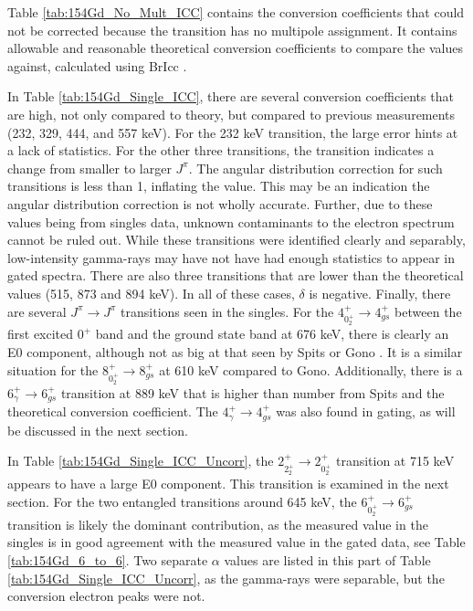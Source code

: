 Table \ref{tab:154Gd_No_Mult_ICC} contains the conversion coefficients that could not be corrected because the transition has no multipole assignment. It contains allowable and reasonable theoretical conversion coefficients to compare the values against, calculated using BrIcc \cite{kibedi08:_BRICC}.

\afterpage{\clearpage}

\afterpage{\clearpage}

\afterpage{\clearpage}   

In Table \ref{tab:154Gd_Single_ICC}, there are several conversion coefficients that are high, not only compared to theory, but compared to previous measurements (232, 329, 444, and 557 keV). For the 232 keV transition, the large error hints at a lack of statistics.  For the other three transitions, the transition indicates a change from smaller to larger $J^{\pi}$. The angular distribution correction for such transitions is less than 1, inflating the value. This may be an indication the angular distribution correction is not wholly accurate. Further, due to these values being from singles data, unknown contaminants to the electron spectrum cannot be ruled out. While these transitions were identified clearly and separably, low-intensity gamma-rays may have not have had enough statistics to appear in gated spectra. There are also three transitions that are lower than the theoretical values (515, 873 and 894 keV). In all of these cases, $\delta$ is negative. Finally, there are several $J^{\pi}\rightarrow J^{\pi}$ transitions seen in the singles. For the $4^+_{0^+_2}\rightarrow 4^+_{gs}$ between the first excited $0^+$ band and the ground state band at 676 keV, there is clearly an E0 component, although not as big at that seen by Spits or Gono \cite{spits96:_154gd, gono74:_154gd_e0}. It is a similar situation for the $8^+_{0^+_2}\rightarrow 8^+_{gs}$ at 610 keV compared to Gono. Additionally, there is a $6_{\gamma}^+\rightarrow 6^+_{gs}$ transition at 889 keV that is higher than number from Spits and the theoretical conversion coefficient. The $4^+_{\gamma}\rightarrow 4^+_{gs}$ was also found in gating, as will be discussed in the next section.

In Table \ref{tab:154Gd_Single_ICC_Uncorr}, the $2^+_{2^+_2}\rightarrow 2^+_{0^+_2}$ transition at 715 keV appears to have a large E0 component. This transition is examined in the next section. For the two entangled transitions around 645 keV, the $6^+_{0^+_2}\rightarrow 6^+_{gs}$ transition is likely the dominant contribution, as the measured value in the singles is in good agreement with the measured value in the gated data, see Table \ref{tab:154Gd_6_to_6}. Two separate $\alpha$ values are listed in this part of Table \ref{tab:154Gd_Single_ICC_Uncorr}, as the gamma-rays were separable, but the conversion electron peaks were not.

